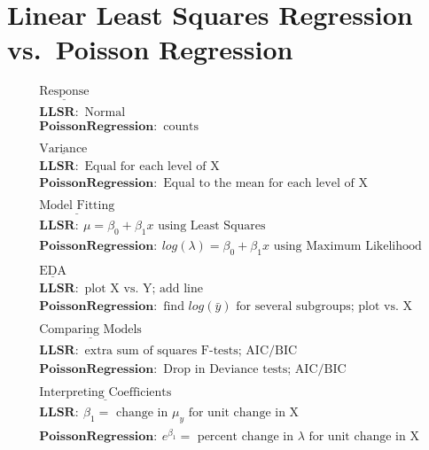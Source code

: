 \documentclass[
]{krantz}
\begin{document}
\hypertarget{linear-least-squares-regression-vs.-poisson-regression}{%
\section{\texorpdfstring{Linear Least Squares Regression  vs.~Poisson Regression }{Linear Least Squares Regression  vs.~Poisson Regression }}\label{linear-least-squares-regression-vs.-poisson-regression}}

\begin{gather*}
\underline{\textrm{Response}} \\
\mathbf{LLSR:}\textrm{ Normal} \\
\mathbf{Poisson Regression:}\textrm{ counts} \\
\textrm{ } \\
\underline{\textrm{Variance}} \\
\mathbf{LLSR:}\textrm{ Equal for each level of X} \\
\mathbf{Poisson Regression:}\textrm{ Equal to the mean for each level of X} \\
\textrm{ } \\
\underline{\textrm{Model Fitting}} \\
\mathbf{LLSR:}\ \mu=\beta_0+\beta_1x \textrm{ using Least Squares}\\
\mathbf{Poisson Regression:}\ log(\lambda)=\beta_0+\beta_1x \textrm{ using Maximum Likelihood}\\
\textrm{ } \\
\underline{\textrm{EDA}} \\
\mathbf{LLSR:}\textrm{ plot X vs. Y; add line} \\
\mathbf{Poisson Regression:}\textrm{ find }log(\bar{y})\textrm{ for several subgroups; plot vs. X} \\
\textrm{ } \\
\underline{\textrm{Comparing Models}} \\
\mathbf{LLSR:}\textrm{ extra sum of squares F-tests; AIC/BIC} \\
\mathbf{Poisson Regression:}\textrm{ Drop in Deviance tests; AIC/BIC} \\
\textrm{ } \\
\underline{\textrm{Interpreting Coefficients}} \\
\mathbf{LLSR:}\ \beta_1=\textrm{ change in }\mu_y\textrm{ for unit change in X} \\
\mathbf{Poisson Regression:}\ e^{\beta_1}=\textrm{ percent change in }\lambda\textrm{ for unit change in X} 
\end{gather*}
\end{document}
